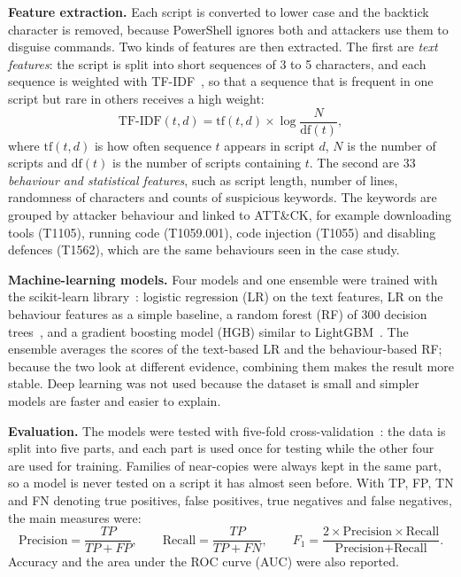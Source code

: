 \documentclass[12pt,a4paper]{article}
\newcommand{\attck}{ATT\&CK}
\newcommand{\head}[1]{\noindent\textbf{#1}\quad}
\begin{document}
\head{Feature extraction.} Each script is converted to lower case and the backtick character is removed, because PowerShell ignores both and attackers use them to disguise commands. Two kinds of features are then extracted. The first are \emph{text features}: the script is split into short sequences of 3 to 5 characters, and each sequence is weighted with TF-IDF~\cite{salton1988}, so that a sequence that is frequent in one script but rare in others receives a high weight:
\begin{equation}
  \text{TF-IDF}(t,d) = \text{tf}(t,d) \times \log\frac{N}{\text{df}(t)},
\end{equation}
where $\text{tf}(t,d)$ is how often sequence $t$ appears in script $d$, $N$ is the number of scripts and $\text{df}(t)$ is the number of scripts containing $t$. The second are 33 \emph{behaviour and statistical features}, such as script length, number of lines, randomness of characters and counts of suspicious keywords. The keywords are grouped by attacker behaviour and linked to \attck{}, for example downloading tools (T1105), running code (T1059.001), code injection (T1055) and disabling defences (T1562), which are the same behaviours seen in the case study.

\head{Machine-learning models.} Four models and one ensemble were trained with the scikit-learn library~\cite{pedregosa2011}: logistic regression (LR) on the text features, LR on the behaviour features as a simple baseline, a random forest (RF) of 300 decision trees~\cite{breiman2001}, and a gradient boosting model (HGB) similar to LightGBM~\cite{ke2017}. The ensemble averages the scores of the text-based LR and the behaviour-based RF; because the two look at different evidence, combining them makes the result more stable. Deep learning was not used because the dataset is small and simpler models are faster and easier to explain.

\head{Evaluation.} The models were tested with five-fold cross-validation~\cite{kohavi1995}: the data is split into five parts, and each part is used once for testing while the other four are used for training. Families of near-copies were always kept in the same part, so a model is never tested on a script it has almost seen before. With TP, FP, TN and FN denoting true positives, false positives, true negatives and false negatives, the main measures were:
\begin{equation}
  \text{Precision} = \frac{TP}{TP+FP},\qquad \text{Recall} = \frac{TP}{TP+FN},\qquad F_1 = \frac{2 \times \text{Precision} \times \text{Recall}}{\text{Precision} + \text{Recall}}.
\end{equation}
Accuracy and the area under the ROC curve (AUC) were also reported.
\end{document}
